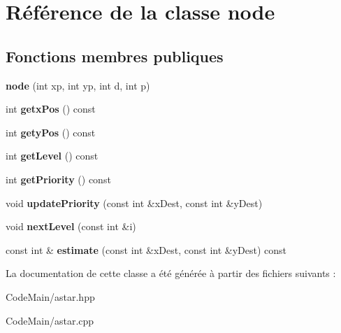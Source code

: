 \hypertarget{classnode}{}\section{Référence de la classe node}
\label{classnode}
\subsection*{Fonctions membres publiques}
\begin{DoxyCompactItemize}
\item 
\hypertarget{classnode_a802701cab6639590de6f16136184c2de}{}{\bfseries node} (int xp, int yp, int d, int p)\label{classnode_a802701cab6639590de6f16136184c2de}

\item 
\hypertarget{classnode_a419596f9858640ee6d04b69b616b7cd2}{}int {\bfseries getx\+Pos} () const \label{classnode_a419596f9858640ee6d04b69b616b7cd2}

\item 
\hypertarget{classnode_a3b5d135d5e5eac9211a9478ea9803ae7}{}int {\bfseries gety\+Pos} () const \label{classnode_a3b5d135d5e5eac9211a9478ea9803ae7}

\item 
\hypertarget{classnode_a78c66d7badca074b6b34ec7eca4ab106}{}int {\bfseries get\+Level} () const \label{classnode_a78c66d7badca074b6b34ec7eca4ab106}

\item 
\hypertarget{classnode_afebf5ef7f94fa7554890f03e97686de7}{}int {\bfseries get\+Priority} () const \label{classnode_afebf5ef7f94fa7554890f03e97686de7}

\item 
\hypertarget{classnode_ad51b92de008bd5107a7b55cc61fc497b}{}void {\bfseries update\+Priority} (const int \&x\+Dest, const int \&y\+Dest)\label{classnode_ad51b92de008bd5107a7b55cc61fc497b}

\item 
\hypertarget{classnode_a04a186013c42fb942b6da90d2e98d4ed}{}void {\bfseries next\+Level} (const int \&i)\label{classnode_a04a186013c42fb942b6da90d2e98d4ed}

\item 
\hypertarget{classnode_a311569dff2e77c4c7953107333960a5d}{}const int \& {\bfseries estimate} (const int \&x\+Dest, const int \&y\+Dest) const \label{classnode_a311569dff2e77c4c7953107333960a5d}

\end{DoxyCompactItemize}


La documentation de cette classe a été générée à partir des fichiers suivants \+:\begin{DoxyCompactItemize}
\item 
Code\+Main/astar.\+hpp\item 
Code\+Main/astar.\+cpp\end{DoxyCompactItemize}
